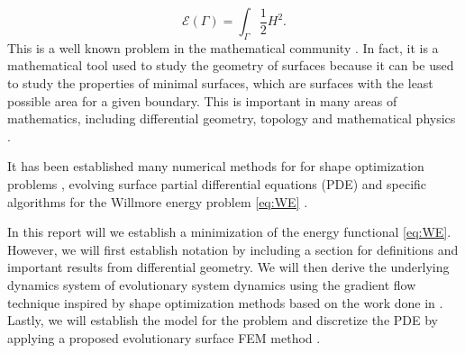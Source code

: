 \begin{equation}
\label{eq:WE}
\mathcal{E} \left( \Gamma  \right) = \int_{\Gamma }^{} \frac{1}{2} H ^2
.\end{equation}
This is a well known problem in the mathematical community \cite{ topping2000towards, marques2014willmore,link2013gradient,kuwert2012willmore}. In fact, it is a mathematical tool used to study the geometry of surfaces because it can be used to study the properties of minimal surfaces, which are surfaces with the least possible area for a given boundary. This is important in many areas of mathematics, including differential geometry, topology and mathematical physics \cite{koerber2021area,jakob2022singularities, rupp21}.



It has been established many numerical methods for for shape optimization problems \cite{sokolowski1992introduction,ito2008variational}, evolving surface partial differential equations (PDE) \cite{dziuk2013finite, dziuk2007finite,
binz2022convergent, barrett2007parametric, barrett2007variational, kovacs2019convergent} and specific
algorithms for the Willmore energy problem \eqref{eq:WE} \cite{palmurella2022parametric, dziuk2008computational, bonito2010parametric,  kovacs2021convergent, hu2022evolving}.

In this report will we establish a minimization of the energy functional \eqref{eq:WE}. However, we will first establish notation by including a section for definitions and important results from differential geometry. We will then derive the
underlying dynamics system of evolutionary system dynamics using the gradient flow technique inspired by shape optimization methods based on the work done in \cite{ dougan2012first}. Lastly, we will establish the model for the problem and discretize the
PDE by applying a proposed evolutionary surface FEM method \cite{kovacs2021convergent}.



